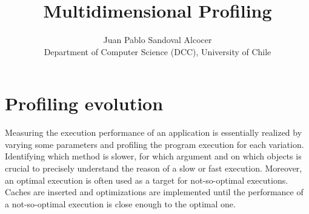 \documentclass[10pt, conference, compsocconf]{IEEEtran}
\newcommand{\Title}{Multidimensional Profiling}
\newcommand{\TitleShort}{\Title}
\newcommand{\Authors}{Juan Pablo Sandoval Alcocer}
\newcommand{\AuthorsShort}{J. P. Sandoval}
\newcommand{\seclabel}[1]{\label{sec:#1}}
\begin{document}
\title{\Title}

\author{\Authors\\[3mm]
Department of Computer Science (DCC), University of Chile
} 

\maketitle


%
%
%
%

\section{Profiling evolution}\seclabel{problem}

Measuring the execution performance of an application is essentially realized by varying some parameters and profiling the program execution for each variation. Identifying which method is slower, for which argument and on which objects is crucial to precisely understand the reason of a slow or fast execution. Moreover, an optimal execution is often used as a target for not-so-optimal executions. Caches are inserted and optimizations are implemented until the performance of a not-so-optimal execution is close enough to the optimal one.
\end{document}

